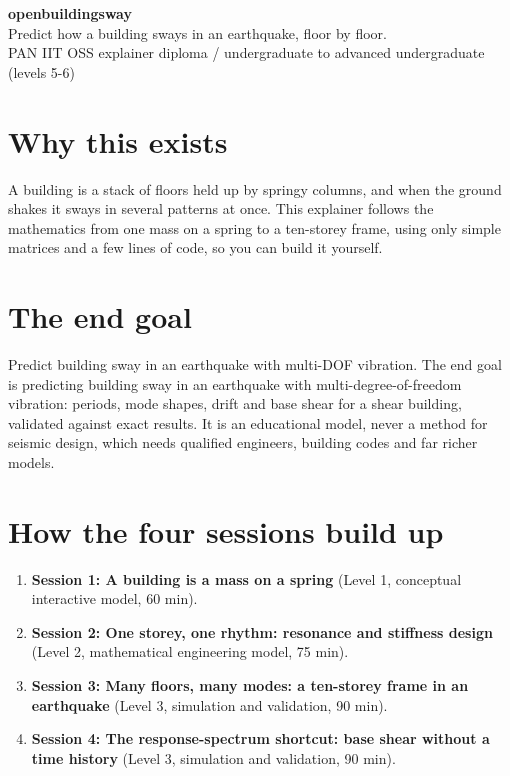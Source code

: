\documentclass[11pt,a4paper]{article}
\begin{document}
\begin{center}{\LARGE\bfseries openbuildingsway}\\[0.4em]{\large Predict how a building sways in an earthquake, floor by floor.}\\[0.2em]\small PAN IIT OSS explainer \textbullet{} diploma / undergraduate to advanced undergraduate (levels 5-6)\end{center}

\section*{Why this exists}
A building is a stack of floors held up by springy columns, and when the ground shakes it sways in several patterns at once. This explainer follows the mathematics from one mass on a spring to a ten-storey frame, using only simple matrices and a few lines of code, so you can build it yourself.

\section*{The end goal}
Predict building sway in an earthquake with multi-DOF vibration. The end goal is predicting building sway in an earthquake with multi-degree-of-freedom vibration: periods, mode shapes, drift and base shear for a shear building, validated against exact results. It is an educational model, never a method for seismic design, which needs qualified engineers, building codes and far richer models.

\section*{How the four sessions build up}
\begin{enumerate}[nosep]
\item \textbf{Session 1: A building is a mass on a spring} (Level 1, conceptual interactive model, 60 min).
\item \textbf{Session 2: One storey, one rhythm: resonance and stiffness design} (Level 2, mathematical engineering model, 75 min).
\item \textbf{Session 3: Many floors, many modes: a ten-storey frame in an earthquake} (Level 3, simulation and validation, 90 min).
\item \textbf{Session 4: The response-spectrum shortcut: base shear without a time history} (Level 3, simulation and validation, 90 min).
\end{enumerate}
\end{document}
